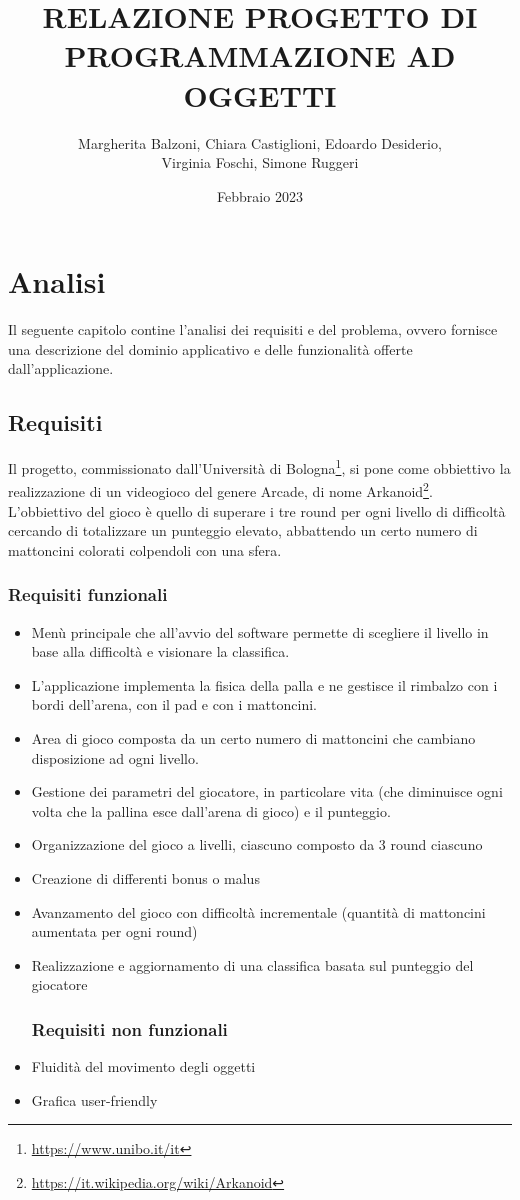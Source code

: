 \documentclass[a4paper,12pt]{report}
\title{RELAZIONE PROGETTO DI PROGRAMMAZIONE AD OGGETTI}
\author{Margherita Balzoni, Chiara Castiglioni, Edoardo Desiderio, \\Virginia Foschi, Simone Ruggeri}
\date{Febbraio 2023}
\begin{document}
\maketitle
\titlepage
\tableofcontents
\newpage

\chapter{Analisi}
Il seguente capitolo contine l'analisi dei requisiti e del problema, ovvero fornisce una descrizione del dominio applicativo e delle funzionalità offerte dall'applicazione.
\section{Requisiti}
Il progetto, commissionato dall'Università di Bologna\footnote{\url{https://www.unibo.it/it}}, si pone come obbiettivo la realizzazione di un videogioco del genere Arcade, di nome Arkanoid\footnote{\url{https://it.wikipedia.org/wiki/Arkanoid}}.\\L'obbiettivo del gioco è quello di superare i tre round per ogni livello di difficoltà cercando di totalizzare un punteggio elevato, abbattendo un certo numero di mattoncini colorati colpendoli con una sfera.
\\
\subsection*{Requisiti funzionali}
\begin{itemize}
    \item Menù principale che all'avvio del software permette di scegliere il livello in base alla difficoltà e visionare la classifica.
    \item L’applicazione implementa la fisica della palla e ne gestisce il rimbalzo con i bordi dell’arena, con il pad e con i mattoncini.
    \item Area di gioco composta da un certo numero di mattoncini che cambiano disposizione ad ogni livello.
    \item Gestione dei parametri del giocatore, in particolare vita (che diminuisce ogni volta che la pallina esce dall'arena di gioco) e il punteggio.
    \item Organizzazione del gioco a livelli, ciascuno composto da 3 round ciascuno
    \item Creazione di differenti bonus o malus
    \item Avanzamento del gioco con difficoltà incrementale (quantità di mattoncini aumentata per ogni round)
    \item Realizzazione e aggiornamento di una classifica basata sul punteggio del giocatore
          \subsection*{Requisiti non funzionali}
    \item Fluidità del movimento degli oggetti
    \item Grafica user-friendly
\end{itemize}
\end{document}
